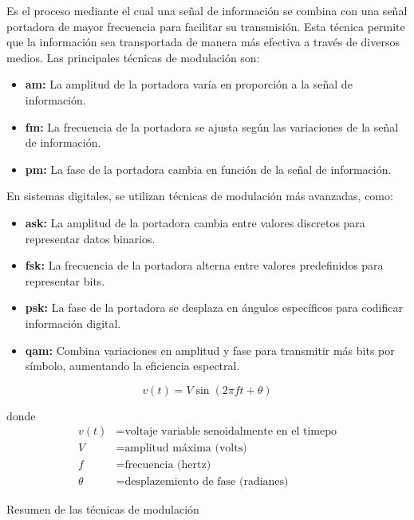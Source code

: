 \begin{justify}
    Es el proceso mediante el cual una señal de información se combina con una señal portadora de mayor frecuencia para facilitar su transmisión. Esta
    técnica permite que la información sea transportada de manera más efectiva a través de diversos medios. Las principales técnicas de modulación son:

    \begin{itemize}
        \item \textbf{\acrlong{am}:} La amplitud de la portadora varía en proporción a la señal de información.
        
        \item \textbf{\acrlong{fm}:} La frecuencia de la portadora se ajusta según las variaciones de la señal de información.
        
        \item \textbf{\acrlong{pm}:} La fase de la portadora cambia en función de la señal de información.
    \end{itemize}

    En sistemas digitales, se utilizan técnicas de modulación más avanzadas, como:

    \begin{itemize}
        \item \textbf{\acrlong{ask}:} La amplitud de la portadora cambia entre valores discretos para representar datos binarios.
        
        \item \textbf{\acrlong{fsk}:} La frecuencia de la portadora alterna entre valores predefinidos para representar bits.
        
        \item \textbf{\acrlong{psk}:} La fase de la portadora se desplaza en ángulos específicos para codificar información digital.
        
        \item \textbf{\acrlong{qam}:} Combina variaciones en amplitud y fase para transmitir más bits por símbolo, aumentando la eficiencia espectral.
    \end{itemize}

    \begin{equation}
        v(t) = V \sin(2\pi f t + \theta)
    \end{equation}

    donde
    \begin{equation*}
        \begin{array}{rl}
            v(t) & = \text{voltaje variable senoidalmente en el timepo}\\
            V & = \text{amplitud máxima (volts)}\\
            f & = \text{frecuencia (hertz)}\\
            \theta & = \text{desplazemiento de fase (radianes)}
        \end{array}
    \end{equation*}

    Resumen de las técnicas de modulación
\end{justify}

